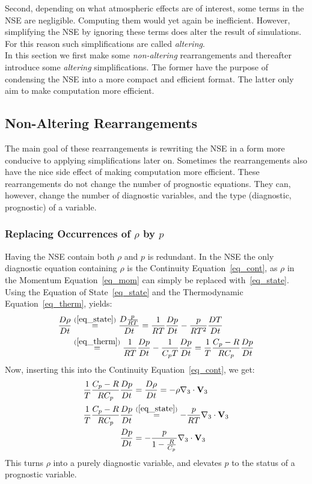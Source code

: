 Second, depending on what atmospheric effects are of interest, some terms in the NSE are negligible.
Computing them would yet again be inefficient.
However, simplifying the NSE by ignoring these terms does alter the result of simulations.
For this reason such simplifications are called \emph{altering}.
\\

\noindent
In this section we first make some \emph{non-altering} rearrangements and thereafter introduce some \emph{altering} simplifications.
The former have the purpose of condensing the NSE into a more compact and efficient format.
The latter only aim to make computation more efficient.

\subsection{Non-Altering Rearrangements}\label{sec:non_altering}
The main goal of these rearrangements is rewriting the NSE in a form more conducive to applying simplifications later on.
Sometimes the rearrangements also have the nice side effect of making computation more efficient.
These rearrangements do not change the number of prognostic equations.
They can, however, change the number of diagnostic variables, and the type (diagnostic, prognostic) of a variable.

\subsubsection{Replacing Occurrences of $\rho$ by $p$}\label{subsec_rho_p}
Having the NSE contain both $\rho$ and $p$ is redundant.
In the NSE the only diagnostic equation containing $\rho$ is the Continuity Equation~\ref{eq_cont}, as $\rho$ in the Momentum Equation~\ref{eq_mom} can simply be replaced with~\ref{eq_state}.
Using the Equation of State~\ref{eq_state} and the Thermodynamic Equation~\ref{eq_therm}, yields:
\begin{align*}
\frac{D\rho}{Dt} &\stackrel{(\ref{eq_state})}{=} \frac{D\frac{p}{RT}}{Dt} = \frac{1}{RT}\frac{Dp}{Dt}-\frac{p}{RT^2}\frac{DT}{Dt}\\
&\stackrel{(\ref{eq_therm})}{=} \frac{1}{RT}\frac{Dp}{Dt}-\frac{1}{C_pT}\frac{Dp}{Dt} = \frac{1}{T}\frac{C_p-R}{RC_p}\frac{Dp}{Dt}
\end{align*}
Now, inserting this into the Continuity Equation~\ref{eq_cont}, we get:
\begin{align*}
\frac{1}{T}\frac{C_p-R}{RC_p}\frac{Dp}{Dt} &= \frac{D\rho}{Dt} = -\rho \nabla _3 \cdot \textbf{V}_3\\
\frac{1}{T}\frac{C_p-R}{RC_p}\frac{Dp}{Dt} &\stackrel{(\ref{eq_state})}{=} -\frac{p}{RT} \nabla _3 \cdot \textbf{V}_3\\
\frac{Dp}{Dt} &= - \frac{p}{1-\frac{R}{C_p}} \nabla _3 \cdot \textbf{V}_3
\end{align*}
This turns $\rho$ into a purely diagnostic variable, and elevates $p$ to the status of a prognostic variable.

